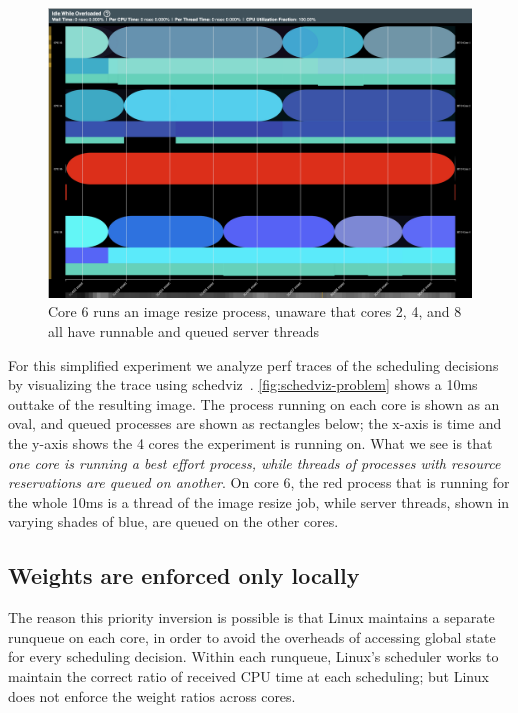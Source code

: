 \begin{figure}[t]
    \centering
    \includegraphics[width=\columnwidth]{graphs/schedviz-problem.png}
    \caption{Core 6 runs an image resize process, unaware that cores 2, 4, and 8
    all have runnable and queued server threads}\label{fig:schedviz-problem}
\end{figure}

For this simplified experiment we analyze perf traces of the scheduling
decisions by visualizing the trace using schedviz~\cite{schedviz-tool}.
\autoref{fig:schedviz-problem} shows a 10ms outtake of the resulting image. The
process running on each core is shown as an oval, and queued processes are shown
as rectangles below; the x-axis is time and the y-axis shows the 4 cores the
experiment is running on. What we see is that \textit{one core is running a best
effort process, while threads of processes with resource reservations are queued
on another}. On core 6, the red process that is running for the whole 10ms is a
thread of the image resize job, while server threads, shown in varying shades of
blue, are queued on the other cores.

\subsection{Weights are enforced only locally}\label{ss:problem:weights-local}

The reason this priority inversion is possible is that Linux maintains a
separate runqueue on each core, in order to avoid the overheads of accessing
global state for every scheduling decision. Within each runqueue, Linux's
scheduler works to maintain the correct ratio of received CPU time at each
scheduling; but Linux does not enforce the weight ratios across cores. 

